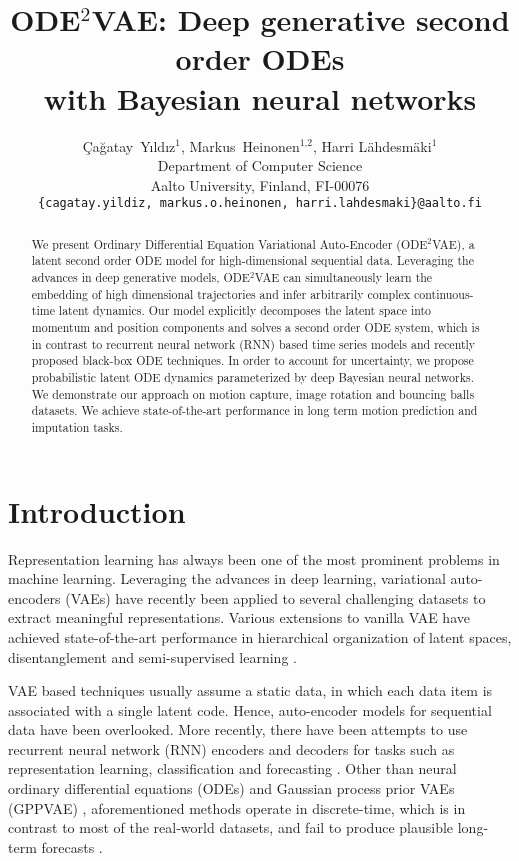 \documentclass{article}
\title{ODE$^2$VAE: Deep generative second order ODEs \\ with Bayesian neural networks}
\author{\c{C}a\u{g}atay~Y{\i}ld{\i}z$^{\text{1}}$, Markus~Heinonen$^{\text{1,2}}$, Harri L{\"a}hdesm{\"a}ki$^{\text{1}}$ \\
  Department of Computer Science\\
  Aalto University, Finland, FI-00076 \\
  \texttt{\{cagatay.yildiz, markus.o.heinonen, harri.lahdesmaki\}@aalto.fi}
}
\newcommand{\0}{\mathbf{0}}
\begin{document}
\maketitle

\begin{abstract}
We present Ordinary Differential Equation Variational Auto-Encoder (ODE$^2$VAE), a latent second order ODE model for high-dimensional sequential data. Leveraging the advances in deep generative models, ODE$^2$VAE can simultaneously learn the embedding of high dimensional trajectories and infer arbitrarily complex continuous-time latent dynamics. Our model explicitly decomposes the latent space into momentum and position components and solves a second order ODE system, which is in contrast to recurrent neural network (RNN) based time series models and recently proposed black-box ODE techniques. In order to account for uncertainty, we propose probabilistic latent ODE dynamics parameterized by deep Bayesian neural networks. We demonstrate our approach on motion capture, image rotation and bouncing balls datasets. We achieve state-of-the-art performance in long term motion prediction and imputation tasks.
\end{abstract}




\section{Introduction}
Representation learning has always been one of the most prominent problems in machine learning. Leveraging the advances in deep learning, variational auto-encoders (VAEs) have recently been applied to several challenging datasets to extract meaningful representations. Various extensions to vanilla VAE have achieved state-of-the-art performance in hierarchical organization of latent spaces, disentanglement and semi-supervised learning \citep{tschannen2018recent}. 

VAE based techniques usually assume a static data, in which each data item is associated with a single latent code. Hence, auto-encoder models for sequential data have been overlooked. More recently, there have been attempts to use recurrent neural network (RNN) encoders and decoders for tasks such as representation learning, classification and forecasting \citep{srivastava2015unsupervised,lotter2016deep,hsu2017unsupervised,li2018disentangled}. Other than neural ordinary differential equations (ODEs) \citep{chen2018neural} and Gaussian process prior VAEs (GPPVAE) \citep{casale2018gaussian}, aforementioned methods operate in discrete-time, which is in contrast to most of the real-world datasets, and fail to produce plausible long-term forecasts \citep{karl2016deep}. 
\end{document}

